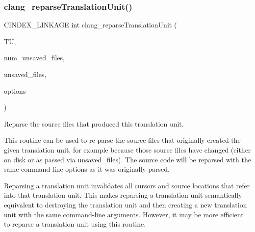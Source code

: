\subsubsection{\texorpdfstring{clang\+\_\+reparse\+Translation\+Unit()}{clang\_reparseTranslationUnit()}}
{\footnotesize\ttfamily C\+I\+N\+D\+E\+X\+\_\+\+L\+I\+N\+K\+A\+GE int clang\+\_\+reparse\+Translation\+Unit (\begin{DoxyParamCaption}\item[{\mbox{\hyperlink{group__CINDEX_gacdb7815736ca709ce9a5e1ec2b7e16ac}{C\+X\+Translation\+Unit}}}]{TU,  }\item[{unsigned}]{num\+\_\+unsaved\+\_\+files,  }\item[{struct \mbox{\hyperlink{structCXUnsavedFile}{C\+X\+Unsaved\+File}} $\ast$}]{unsaved\+\_\+files,  }\item[{unsigned}]{options }\end{DoxyParamCaption})}



Reparse the source files that produced this translation unit. 

This routine can be used to re-\/parse the source files that originally created the given translation unit, for example because those source files have changed (either on disk or as passed via {\ttfamily unsaved\+\_\+files}). The source code will be reparsed with the same command-\/line options as it was originally parsed.

Reparsing a translation unit invalidates all cursors and source locations that refer into that translation unit. This makes reparsing a translation unit semantically equivalent to destroying the translation unit and then creating a new translation unit with the same command-\/line arguments. However, it may be more efficient to reparse a translation unit using this routine.


